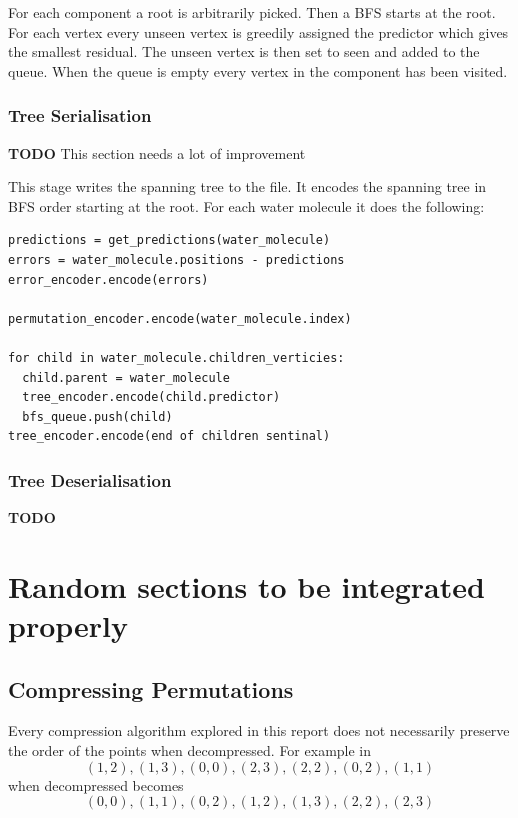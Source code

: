\documentclass{report}
\newcommand{\todo}{\textbf{TODO} }
\begin{document}
For each component a root is arbitrarily picked. Then a BFS starts at the
root. For each vertex every unseen vertex is greedily assigned the predictor
which gives the smallest residual. The unseen vertex is then set to seen and
added to the queue. When the queue is empty every vertex in the component has
been visited.


\subsection{Tree Serialisation}

\todo This section needs a lot of improvement

This stage writes the spanning tree to the file. It encodes the spanning tree
in BFS order starting at the root. For each water molecule it does the following:

\begin{verbatim}
predictions = get_predictions(water_molecule)
errors = water_molecule.positions - predictions
error_encoder.encode(errors)

permutation_encoder.encode(water_molecule.index)

for child in water_molecule.children_verticies:
  child.parent = water_molecule
  tree_encoder.encode(child.predictor)
  bfs_queue.push(child)
tree_encoder.encode(end of children sentinal)
\end{verbatim}


\subsection{Tree Deserialisation}

\todo

\chapter{Random sections to be integrated properly}

\section{Compressing Permutations}
\label{sec:compr-perm}

Every compression algorithm explored in this report does not necessarily
preserve the order of the points when decompressed. For example in
\cite{devillers2000gci}
\[ (1, 2), (1, 3), (0, 0), (2, 3), (2, 2), (0, 2), (1, 1) \]
when decompressed becomes
\[ (0, 0), (1, 1), (0, 2), (1, 2), (1, 3), (2, 2), (2, 3) \]
\end{document}

